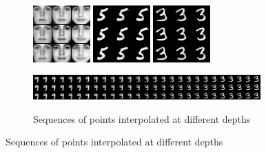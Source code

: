 \begin{figure}
\begin{subfigure}{1.\textwidth}
    \includegraphics[width=0.24\textwidth]{article3/images/1interpolationtfdfold1_rbm2_samples2data_image_noncen.png}
    \includegraphics[width=0.24\textwidth]{article3/images/1interpolationmnist28_cae2_samples28data_image_noncen.png}
    \includegraphics[width=0.24\textwidth]{article3/images/1interpolationmnist28_rbm2_samples16data_image_noncen.png}
\end{subfigure}

\begin{subfigure}{1.\textwidth}
\caption{Sequences of points interpolated at different depths}
    \includegraphics[width=0.96\textwidth]{article3/images/sequenceinterpolation46_data_image_noncen.png}
    \label{fig:seqinterpol}
\end{subfigure}


\end{figure}
